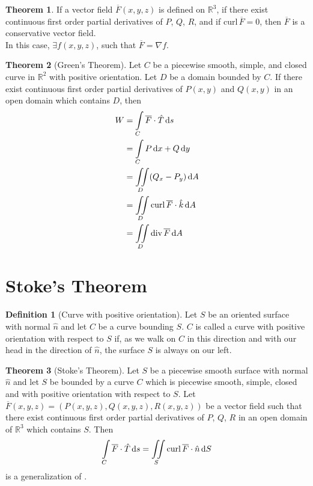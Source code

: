 \documentclass[fleqn, a4paper, 12pt, twoside]{article}
\theoremstyle{definition}
\newtheorem{definition}{Definition}
\theoremstyle{theorem}
\newtheorem{theorem}{Theorem}
\newcommand{\curl}{\mathrm{curl\,}}
\newcommand{\divergence}{\mathrm{div\,}}
\begin{document}
{\begin{theorem}
	If a vector field $\overline{F}(x,y,z)$ is defined on $\mathbb{R}^3$, if there exist continuous first order partial derivatives of $P$, $Q$, $R$, and if $\curl \overline{F} = 0$, then $\overline{F}$ is a conservative vector field.\\
	In this case, $\exists f(x,y,z)$, such that $\overline{F} = \nabla f$.
\end{theorem}

\begin{theorem}[Green's Theorem]
	Let $C$ be a piecewise smooth, simple, and closed curve in $\mathbb{R}^2$ with positive orientation.
	Let $D$ be a domain bounded by $C$.
	If there exist continuous first order partial derivatives of $P(x,y)$ and $Q(x,y)$ in an open domain which contains $D$, then
	\begin{align*}
		W & = \int\limits_{C} \overline{F} \cdot \hat{T} \dif s        \\
                  & = \int\limits_{C} P \dif x + Q \dif y                      \\
                  & = \iint\limits_{D} (Q_x - P_y) \dif A                      \\
                  & = \iint\limits_{D} \curl \overline{F} \cdot \hat{k} \dif A \\
                  & = \iint\limits_{D} \divergence \overline{F} \dif A
	\end{align*}
	\label{Green's_Theorem}
\end{theorem}

\section{Stoke's Theorem}

\begin{definition}[Curve with positive orientation]
	Let $S$ be an oriented surface with normal $\hat{n}$ and let $C$ be a curve bounding $S$.
	$C$ is called a curve with positive orientation with respect to $S$ if, as we walk on $C$ in this direction and with our head in the direction of $\hat{n}$, the surface $S$ is always on our left.
\end{definition}

\begin{theorem}[Stoke's Theorem]
	Let $S$ be a piecewise smooth surface with normal $\hat{n}$ and let $S$ be bounded by a curve $C$ which is piecewise smooth, simple, closed and with positive orientation with respect to $S$.
	Let $\overline{F}(x,y,z) = \left( P(x,y,z), Q(x,y,z), R(x,y,z) \right)$ be a vector field such that there exist continuous first order partial derivatives of $P$, $Q$, $R$ in an open domain of $\mathbb{R}^3$ which contains $S$.
	Then 
	\begin{equation*}
		\int\limits_{C} \overline{F} \cdot \hat{T} \dif s = \iint\limits_{S} \curl \overline{F} \cdot \hat{n} \dif S
	\end{equation*}
	 is a generalization of .
	\label{Stoke's_Theorem}
\end{theorem}

}
\end{document}
